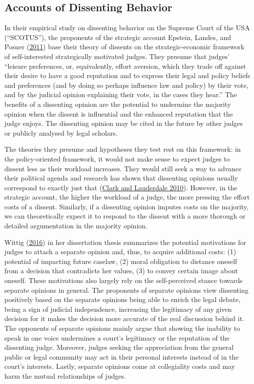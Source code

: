 \documentclass[
  11pt,
]{article}
\begin{document}
\hypertarget{accounts-of-dissenting-behavior}{%
\subsection{Accounts of Dissenting
Behavior}\label{accounts-of-dissenting-behavior}}

In their empirical study on dissenting behavior on the Supreme Court of
the USA (``SCOTUS''), the proponents of the strategic account Epstein,
Landes, and Posner
(\protect\hyperlink{ref-epsteinWhyWhenJudges2011}{2011}) base their
theory of dissents on the strategic-economic framework of
self-interested strategically motivated judges. They presume that
judges' ``leisure preferences, or, equivalently, effort aversion, which
they trade off against their desire to have a good reputation and to
express their legal and policy beliefs and preferences (and by doing so
perhaps influence law and policy) by their vote, and by the judicial
opinion explaining their vote, in the cases they hear.'' The benefits of
a dissenting opinion are the potential to undermine the majority opinion
when the dissent is influential and the enhanced reputation that the
judge enjoys. The dissenting opinion may be cited in the future by other
judges or publicly analysed by legal scholars.

The theories they presume and hypotheses they test rest on this
framework: in the policy-oriented framework, it would not make sense to
expect judges to dissent less as their workload increases. They would
still seek a way to advance their political agenda and research has
shown that dissenting opinions usually correspond to exactly just that
(\protect\hyperlink{ref-clarkLocatingSupremeCourt2010}{Clark and
Lauderdale 2010}). However, in the strategic account, the higher the
workload of a judge, the more pressing the effort costs of a dissent.
Similarly, if a dissenting opinion imputes costs on the majority, we can
theoretically expect it to respond to the dissent with a more thorough
or detailed argumentation in the majority opinion.

Wittig
(\protect\hyperlink{ref-wittigOccurrenceSeparateOpinions2016}{2016}) in
her dissertation thesis summarizes the potential motivations for judges
to attach a separate opinion and, thus, to acquire additional costs: (1)
potential of impacting future caselaw, (2) moral obligation to distance
oneself from a decision that contradicts her values, (3) to convey
certain image about oneself. These motivations also largely rely on the
self-perceived stance towards separate opinions in general. The
proponents of separate opinions view dissenting positively based on the
separate opinions being able to enrich the legal debate, being a sign of
judicial independence, increasing the legitimacy of any given decision
for it makes the decision more accurate of the real discussion behind
it. The opponents of separate opinions mainly argue that showing the
inability to speak in one voice undermines a court's legitimacy or the
reputation of the dissenting judge. Moreover, judges seeking the
appreciation from the general public or legal community may act in their
personal interests instead of in the court's interests. Lastly, separate
opinions come at collegiality costs and may harm the mutual
relationships of judges.
\end{document}
